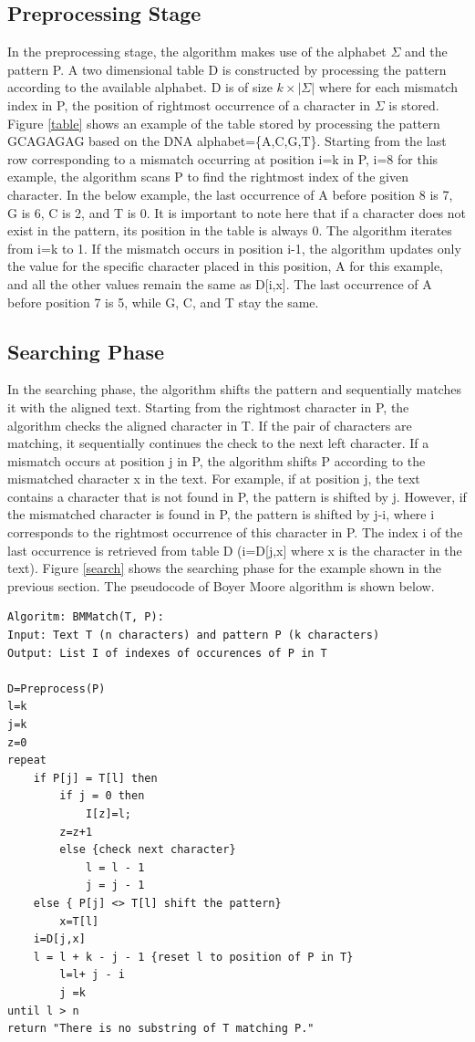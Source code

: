 \documentclass[paper=a4, fontsize=11pt]{scrartcl} %
\numberwithin{equation}{section} %
\numberwithin{figure}{section} %
\numberwithin{table}{section} %
\begin{document}
\subsection{Preprocessing Stage}
In the preprocessing stage, the algorithm makes use of the alphabet $\Sigma$ and the pattern P. A two dimensional table D is constructed by processing the pattern according to the available alphabet. D is of size $k\times|\Sigma|$ where for each mismatch index in P, the position of rightmost occurrence of a character in $\Sigma$ is stored. Figure \ref{table} shows an example of the table stored by processing the pattern GCAGAGAG based on the DNA alphabet=\{A,C,G,T\}. Starting from the last row corresponding to a mismatch occurring at position i=k in P, i=8 for this example, the algorithm scans P to find the rightmost index of the given character. In the below example, the last occurrence of A before position 8 is 7, G is 6, C is 2, and T is 0. It is important to note here that if a character does not exist in the pattern, its position in the table is always 0. The algorithm iterates from i=k to 1. If the mismatch occurs in position i-1, the algorithm updates only the value for the specific character placed in this position, A for this example, and all the other values remain the same as D[i,x]. The last occurrence of A before position 7 is 5, while G, C, and T stay the same.


\subsection{Searching Phase}

In the searching phase, the algorithm shifts the pattern and sequentially matches it with the aligned text. Starting from the rightmost character in P, the algorithm checks the aligned character in T. If the pair of characters are matching, it sequentially continues the check to the next left character. If a mismatch occurs at position j in P, the algorithm shifts P according to the mismatched character x in the text. For example, if at position j, the text contains a character that is not found in P, the pattern is shifted by j. However, if the mismatched character is found in P, the pattern is shifted by j-i, where i corresponds to the rightmost occurrence of this character in P. The index i of the last occurrence is retrieved from table D (i=D[j,x] where x is the character in the text). Figure \ref{search} shows the searching phase for the example shown in the previous section. The pseudocode of Boyer Moore algorithm is shown below.\\
\begin{lstlisting}
Algoritm: BMMatch(T, P):
Input: Text T (n characters) and pattern P (k characters)
Output: List I of indexes of occurences of P in T

D=Preprocess(P)
l=k
j=k
z=0
repeat
    if P[j] = T[l] then
        if j = 0 then
            I[z]=l;
	    z=z+1
        else {check next character}
            l = l - 1
            j = j - 1
    else { P[j] <> T[l] shift the pattern}
        x=T[l]
	i=D[j,x]
	l = l + k - j - 1 {reset l to position of P in T}
        l=l+ j - i
        j =k
until l > n
return "There is no substring of T matching P."
\end{lstlisting}
\end{document}
